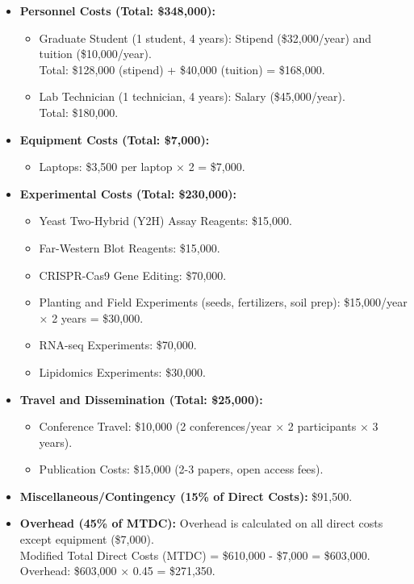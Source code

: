 \documentclass{article}
\begin{document}
\begin{itemize}
    \item \textbf{Personnel Costs (Total: \$348,000):}
    \begin{itemize}
        \item Graduate Student (1 student, 4 years): Stipend (\$32,000/year) and tuition (\$10,000/year). \\
        Total: \$128,000 (stipend) + \$40,000 (tuition) = \$168,000.
        \item Lab Technician (1 technician, 4 years): Salary (\$45,000/year). \\
        Total: \$180,000.
    \end{itemize}

    \item \textbf{Equipment Costs (Total: \$7,000):}
    \begin{itemize}
        \item Laptops: \$3,500 per laptop × 2 = \$7,000.
    \end{itemize}

    \item \textbf{Experimental Costs (Total: \$230,000):}
    \begin{itemize}
        \item Yeast Two-Hybrid (Y2H) Assay Reagents: \$15,000.
        \item Far-Western Blot Reagents: \$15,000.
        \item CRISPR-Cas9 Gene Editing: \$70,000.
        \item Planting and Field Experiments (seeds, fertilizers, soil prep): \$15,000/year × 2 years = \$30,000.
        \item RNA-seq Experiments: \$70,000.
        \item Lipidomics Experiments: \$30,000.
    \end{itemize}

    \item \textbf{Travel and Dissemination (Total: \$25,000):}
    \begin{itemize}
        \item Conference Travel: \$10,000 (2 conferences/year × 2 participants × 3 years).
        \item Publication Costs: \$15,000 (2-3 papers, open access fees).
    \end{itemize}

    \item \textbf{Miscellaneous/Contingency (15\% of Direct Costs):} \$91,500.

    \item \textbf{Overhead (45\% of MTDC):} Overhead is calculated on all direct costs except equipment (\$7,000). \\
    Modified Total Direct Costs (MTDC) = \$610,000 - \$7,000 = \$603,000. \\
    Overhead: \$603,000 × 0.45 = \$271,350.
\end{itemize}
\end{document}
